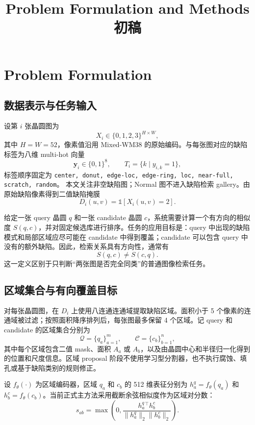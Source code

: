 \documentclass[UTF8,a4paper,11pt,fontset=fandol]{ctexart}
\title{Problem Formulation and Methods 初稿}
\author{}
\date{}
\begin{document}
\setlength{\emergencystretch}{3em}
\sloppy

\maketitle

\section{Problem Formulation}

\subsection{数据表示与任务输入}

设第 \(i\) 张晶圆图为
\[
X_i\in\{0,1,2,3\}^{H\times W},
\]
其中 \(H=W=52\)，像素值沿用 Mixed-WM38 的原始编码。与每张图对应的缺陷标签为八维 multi-hot 向量
\[
\mathbf y_i\in\{0,1\}^{8},\qquad
T_i=\{k\mid y_{i,k}=1\},
\]
标签顺序固定为
\texttt{center, donut, edge-loc, edge-ring, loc, near-full, scratch, random}。
本文关注非空缺陷图；Normal 图不进入缺陷检索 gallery。由原始缺陷像素得到二值缺陷掩膜
\[
D_i(u,v)=\mathbb{1}[X_i(u,v)=2].
\]

给定一张 query 晶圆 \(q\) 和一张 candidate 晶圆 \(c\)，系统需要计算一个有方向的相似度 \(S(q,c)\)，并对固定候选库进行排序。任务的应用目标是：query 中出现的缺陷模式和局部区域应尽可能在 candidate 中得到覆盖；candidate 可以包含 query 中没有的额外缺陷。因此，检索关系具有方向性，通常有
\[
S(q,c)\neq S(c,q).
\]
这一定义区别于只判断“两张图是否完全同类”的普通图像检索任务。

\subsection{区域集合与有向覆盖目标}

对每张晶圆图，在 \(D_i\) 上使用八连通连通域提取缺陷区域。面积小于 5 个像素的连通域被过滤；按照面积降序排列后，每张图最多保留 4 个区域。记 query 和 candidate 的区域集合分别为
\[
\mathcal Q=\{q_a\}_{a=1}^{m},\qquad
\mathcal C=\{c_b\}_{b=1}^{n},
\]
其中每个区域包含二值 mask、面积 \(A_a\) 或 \(A_b\)，以及由晶圆中心和半径归一化得到的位置和尺度信息。区域 proposal 阶段不使用学习型分割器，也不执行腐蚀、填孔或基于缺陷类别的规则修正。

设 \(f_\theta(\cdot)\) 为区域编码器，区域 \(q_a\) 和 \(c_b\) 的 512 维表征分别为 \(h^q_a=f_\theta(q_a)\) 和 \(h^c_b=f_\theta(c_b)\)。当前正式主方法采用截断余弦相似度作为区域对分数：
\[
s_{ab}=\max\left(0,\frac{h^q_a{}^{\top}h^c_b}
{\lVert h^q_a\rVert_2\lVert h^c_b\rVert_2}\right).
\]
\end{document}
